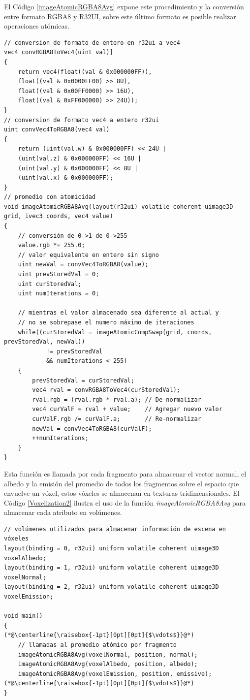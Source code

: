 El Código \ref{imageAtomicRGBA8Avg} expone este procedimiento y la conversión entre formato RGBA8 y R32UI, sobre este último formato es posible realizar operaciones atómicas.
\\
\begin{lstlisting}[caption={Conversion entre RGBA8 y R32UI y promedio incremental.}, label=imageAtomicRGBA8Avg]
// conversion de formato de entero en r32ui a vec4
vec4 convRGBA8ToVec4(uint val)]
{
    return vec4(float((val & 0x000000FF)), 
    float((val & 0x0000FF00) >> 8U), 
    float((val & 0x00FF0000) >> 16U), 
    float((val & 0xFF000000) >> 24U));
}
// conversion de formato vec4 a entero r32ui
uint convVec4ToRGBA8(vec4 val)
{
    return (uint(val.w) & 0x000000FF) << 24U | 
    (uint(val.z) & 0x000000FF) << 16U | 
    (uint(val.y) & 0x000000FF) << 8U | 
    (uint(val.x) & 0x000000FF);
}
// promedio con atomicidad
void imageAtomicRGBA8Avg(layout(r32ui) volatile coherent uimage3D grid, ivec3 coords, vec4 value)
{
    // conversión de 0->1 de 0->255
    value.rgb *= 255.0;
    // valor equivalente en entero sin signo
    uint newVal = convVec4ToRGBA8(value);
    uint prevStoredVal = 0;
    uint curStoredVal;
    uint numIterations = 0;

    // mientras el valor almacenado sea diferente al actual y 
    // no se sobrepase el numero máximo de iteraciones
    while((curStoredVal = imageAtomicCompSwap(grid, coords, prevStoredVal, newVal)) 
            != prevStoredVal
            && numIterations < 255)
    {
        prevStoredVal = curStoredVal;
        vec4 rval = convRGBA8ToVec4(curStoredVal);
        rval.rgb = (rval.rgb * rval.a); // De-normalizar
        vec4 curValF = rval + value;    // Agregar nuevo valor
        curValF.rgb /= curValF.a;       // Re-normalizar
        newVal = convVec4ToRGBA8(curValF);
        ++numIterations;
    }
}
\end{lstlisting}

Esta función es llamada por cada fragmento para almacenar el vector normal, el albedo y la emisión del promedio de todos los fragmentos sobre el espacio que envuelve un vóxel, estos vóxeles se almacenan en texturas tridimensionales. El Código \ref{Voxelization2} ilustra el uso de la función \emph{imageAtomicRGBA8Avg} para almacenar cada atributo en volúmenes.
\\
\begin{lstlisting}[caption={Composición de fragmentos y vóxeles}, label=Voxelization2]
// volúmenes utilizados para almacenar información de escena en vóxeles
layout(binding = 0, r32ui) uniform volatile coherent uimage3D voxelAlbedo;
layout(binding = 1, r32ui) uniform volatile coherent uimage3D voxelNormal;
layout(binding = 2, r32ui) uniform volatile coherent uimage3D voxelEmission;

void main()
{
(*@\centerline{\raisebox{-1pt}[0pt][0pt]{$\vdots$}}@*)
    // llamadas al promedio atómico por fragmento
    imageAtomicRGBA8Avg(voxelNormal, position, normal);
    imageAtomicRGBA8Avg(voxelAlbedo, position, albedo);
    imageAtomicRGBA8Avg(voxelEmission, position, emissive);
(*@\centerline{\raisebox{-1pt}[0pt][0pt]{$\vdots$}}@*)
}
\end{lstlisting}

